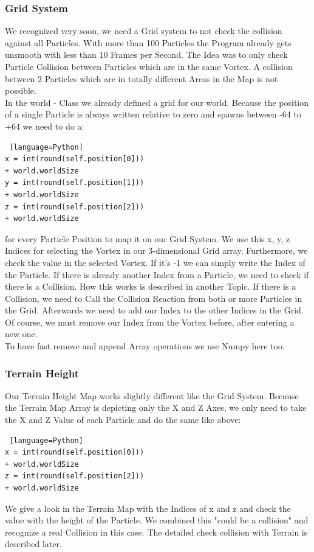 \documentclass{sig-alternate-05-2015}
\begin{document}
\subsubsection{Grid System}
We recognized very soon, we need a Grid system to not check the collision against all Particles. With more than 100 Particles the Program already gets unsmooth with less than 10 Frames per Second. The Idea was to only check Particle Collision between Particles which are in the same Vortex. A collision between 2 Particles which are in totally different Areas in the Map is not possible.\\
In the world - Class we already defined a grid for our world. Because the position of a single Particle is always written relative to zero and spawns between -64 to +64 we need to do a: \\
\begin{lstlisting} [language=Python]
x = int(round(self.position[0])) 
+ world.worldSize
y = int(round(self.position[1]))
+ world.worldSize
z = int(round(self.position[2]))
+ world.worldSize
\end{lstlisting}
for every Particle Position to map it on our Grid System. We use this x, y, z Indices for selecting the Vortex in our 3-dimensional Grid array. Furthermore, we check the value in the selected Vortex. If it's -1 we can simply write the Index of the Particle. If there is already another Index from a Particle, we need to check if there is a Collision. How this works is described in another Topic. If there is a Collision, we need to Call the Collision Reaction from both or more Particles in the Grid. Afterwards we need to add our Index to the other Indices in the Grid. Of course, we must remove our Index from the Vortex before, after entering a new one. \\
To have fast remove and append Array operations we use Numpy here too. \\
\subsubsection{Terrain Height}
Our Terrain Height Map works slightly different like the Grid System. Because the Terrain Map Array is depicting only the X and Z Axes, we only need to take the X and Z Value of each Particle and do the same like above: \\
\begin{lstlisting} [language=Python]
x = int(round(self.position[0]))
+ world.worldSize
z = int(round(self.position[2]))
+ world.worldSize
\end{lstlisting}
We give a look in the Terrain Map with the Indices of x and z and check the value with the height of the Particle. We combined this "could be a collision" and recognize a real Collision in this case. The detailed check collision with Terrain is described later. \\
\end{document}
